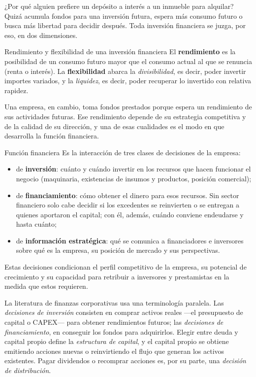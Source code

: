 ¿Por qué alguien prefiere un depósito a interés a un inmueble para alquilar? Quizá acumula fondos para una inversión futura, espera más consumo futuro o busca más libertad para decidir después. Toda inversión financiera se juzga, por eso, en dos dimensiones.

\begin{definicion}{Rendimiento y flexibilidad de una inversión financiera}
El \textbf{rendimiento} es la posibilidad de un consumo futuro mayor que el consumo actual al que se renuncia (renta o interés). La \textbf{flexibilidad} abarca la \emph{divisibilidad}, es decir, poder invertir importes variados, y la \emph{liquidez}, es decir, poder recuperar lo invertido con relativa rapidez.
\end{definicion}

Una empresa, en cambio, toma fondos prestados porque espera un rendimiento de sus actividades futuras. Ese rendimiento depende de su estrategia competitiva y de la calidad de su dirección, y una de esas cualidades es el modo en que desarrolla la función financiera.

\begin{definicion}{Función financiera}
Es la interacción de tres clases de decisiones de la empresa:
\begin{itemize}
\item de \textbf{inversión}: cuánto y cuándo invertir en los recursos que hacen funcionar el negocio (maquinaria, existencias de insumos y productos, posición comercial);
\item de \textbf{financiamiento}: cómo obtener el dinero para esos recursos. Sin sector financiero solo cabe decidir si los excedentes se reinvierten o se entregan a quienes aportaron el capital; con él, además, cuándo conviene endeudarse y hasta cuánto;
\item de \textbf{información estratégica}: qué se comunica a financiadores e inversores sobre qué es la empresa, su posición de mercado y sus perspectivas.
\end{itemize}
\end{definicion}

Estas decisiones condicionan el perfil competitivo de la empresa, su potencial de crecimiento y su capacidad para retribuir a inversores y prestamistas en la medida que estos requieren.

La literatura de finanzas corporativas usa una terminología paralela. Las \emph{decisiones de inversión} consisten en comprar activos reales —el presupuesto de capital o CAPEX— para obtener rendimientos futuros; las \emph{decisiones de financiamiento}, en conseguir los fondos para adquirirlos. Elegir entre deuda y capital propio define la \emph{estructura de capital}, y el capital propio se obtiene emitiendo acciones nuevas o reinvirtiendo el flujo que generan los activos existentes. Pagar dividendos o recomprar acciones es, por su parte, una \emph{decisión de distribución}.

